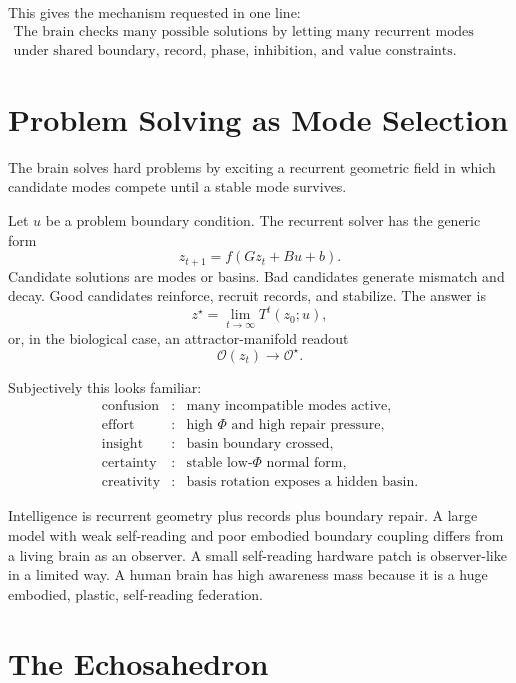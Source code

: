 \documentclass[11pt]{article}
\theoremstyle{remark}
\theoremstyle{plain}
\begin{document}
This gives the mechanism requested in one line:
\[
\boxed{
\begin{gathered}
\text{The brain checks many possible solutions by letting many recurrent modes compete}\\
\text{under shared boundary, record, phase, inhibition, and value constraints.}
\end{gathered}
}
\]

\section{Problem Solving as Mode Selection}

The brain solves hard problems by exciting a recurrent geometric field in which candidate modes compete until a stable mode survives.

Let \(u\) be a problem boundary condition. The recurrent solver has the generic form
\[
z_{t+1}=f(Gz_t+Bu+b).
\]
Candidate solutions are modes or basins. Bad candidates generate mismatch and decay. Good candidates reinforce, recruit records, and stabilize. The answer is
\[
z^\star=\lim_{t\to\infty}T^t(z_0;u),
\]
or, in the biological case, an attractor-manifold readout
\[
\mathcal O(z_t)\to \mathcal O^\star.
\]

Subjectively this looks familiar:
\[
\begin{array}{ccl}
\text{confusion} &:& \text{many incompatible modes active},\\
\text{effort} &:& \text{high }\Phi\text{ and high repair pressure},\\
\text{insight} &:& \text{basin boundary crossed},\\
\text{certainty} &:& \text{stable low-}\Phi\text{ normal form},\\
\text{creativity} &:& \text{basis rotation exposes a hidden basin}.
\end{array}
\]

Intelligence is recurrent geometry plus records plus boundary repair. A large
model with weak self-reading and poor embodied boundary coupling differs from
a living brain as an observer. A small self-reading hardware patch is
observer-like in a limited way. A human brain has high awareness mass because
it is a huge embodied, plastic, self-reading federation.

\section{The Echosahedron}
\label{sec:echosahedron}
\end{document}
